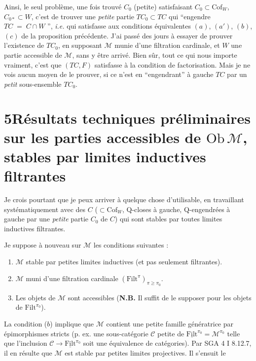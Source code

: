 \documentclass[11pt]{article}
\newcommand{\printedpage}[1]{\marginpar{\footnotesize p.~#1}}
\newcommand{\msp}[1]{\marginpar{\footnotesize [#1]}}
\newcommand{\cM}{\mathcal{M}}
\newcommand{\Filt}{\mathrm{Filt}}
\newcommand{\uFilt}{\underline{\mathrm{Filt}}}
\newcommand{\Cof}{\mathrm{Cof}}
\newcommand{\cC}{\mathcal{C}}
\begin{document}
\msp{page 43}
Ainsi, le seul problème, une fois trouvé $C_0$ (petite) satisfaisant $C_0\subset\Cof_W$, $C_{0*}\subset W$, c'est de trouver une \textit{petite} partie $TC_0\subset TC$ qui “engendre $TC\;=\;C\cap W$ ”, \textit{i.e.} qui satisfasse aux conditions équivalentes $(a)$, $(a')$, $(b)$, $(c)$ de la proposition précédente. J'ai passé des jours à essayer de prouver l'existence de $TC_0$, en supposant $\mathcal{M}$ munie d'une filtration cardinale, et $W$ une partie accessible de $\mathcal{M}$, sans y être arrivé. Bien sûr, tout ce qui nous importe vraiment, c'est que $(TC,F)$ satisfasse à la condition de factorisation. Mais je ne vois aucun moyen de le prouver, si ce n'est en “engendrant” à gauche $TC$ par un \textit{petit} sous-ensemble $TC_0$.

\section*{5\quad Résultats techniques préliminaires sur les parties accessibles de $\mathrm{Ob}\,\mathcal{M}$, stables par limites inductives filtrantes}

Je crois pourtant que je peux arriver à quelque chose d'utilisable, en travaillant systématiquement avec des $C$ ($\subset\Cof_W$, Q-closes à gauche, Q-engendrées à gauche par une \textit{petite} partie $C_0$ de $C$) qui sont stables par toutes limites inductives filtrantes.

\printedpage{29}

Je suppose à nouveau sur $\cM$ les conditions suivantes :
\msp{page 44}

\begin{enumerate}[nosep]
\item[\textit{a})] $\cM$ stable par petites limites inductives (et pas seulement filtrantes).
\item[\textit{b})] $\cM$ muni d'une filtration cardinale $(\Filt^{\pi})_{\pi\geq\pi_0}$.
\item[\textit{c})] Les objets de $\cM$ sont accessibles (\textbf{N.B.} Il suffit de le supposer pour les objets de $\Filt^{\pi_0}$).
\end{enumerate}

La condition ($b$) implique que $\cM$ contient une petite famille génératrice par épimorphismes stricts (p. ex. une sous-catégorie $\cC$ petite de $\uFilt^{\pi_0} = \cM^{\pi_0}$ telle que l'inclusion $\cC \longrightarrow \uFilt^{\pi_0}$ soit une équivalence de catégories). Par SGA 4 I 8.12.7, il en résulte que $\cM$ est stable par petites limites projectives. Il s'ensuit le
\end{document}
